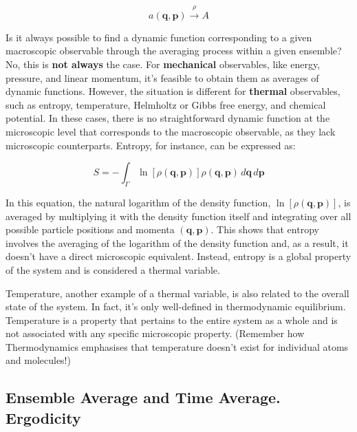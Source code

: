 \documentclass[12pt,a4paper]{report}
\newcommand{\esp}{\vspace{0.5cm}}
\begin{document}
	\esp
	
	\begin{equation}
		a(\mathbf{q}, \mathbf{p}) \xrightarrow{\rho} A
	\end{equation}
	
	\esp
	
	Is it always possible to find a dynamic function corresponding to a given macroscopic observable through the averaging process within a given ensemble? No, this is \textbf{not always} the case. For \textbf{mechanical} observables, like energy, pressure, and linear momentum, it’s feasible to obtain them as averages of dynamic functions. However, the situation is different for \textbf{thermal} observables, such as entropy, temperature, Helmholtz or Gibbs free energy, and chemical potential. In these cases, there is no straightforward dynamic function at the microscopic level that corresponds to the macroscopic observable, as they lack microscopic counterparts. Entropy, for instance, can be expressed as:
	
	\esp
	
	\begin{equation}
		S = -\int_{\Gamma} \ln [\rho(\mathbf{q}, \mathbf{p})] \rho(\mathbf{q}, \mathbf{p}) \, d\mathbf{q} \, d\mathbf{p}
	\end{equation}
	
	\esp
	
	In this equation, the natural logarithm of the density function, $\ln [\rho(\mathbf{q}, \mathbf{p})]$, is averaged by multiplying it with the density function itself and integrating over all possible particle positions and momenta $(\mathbf{q}, \mathbf{p})$. This shows that entropy involves the averaging of the logarithm of the density function and, as a result, it doesn’t have a direct microscopic equivalent. Instead, entropy is a global property of the system and is considered a thermal variable.
	
	\esp
	
	Temperature, another example of a thermal variable, is also related to the overall state of the system. In fact, it’s only well-defined in thermodynamic equilibrium. Temperature is a property that pertains to the entire system as a whole and is not associated with any specific microscopic property. (Remember how Thermodynamics emphasises that temperature doesn’t exist for individual atoms and molecules!)
	
	\subsection{Ensemble Average and Time Average. Ergodicity}
	
\end{document}
